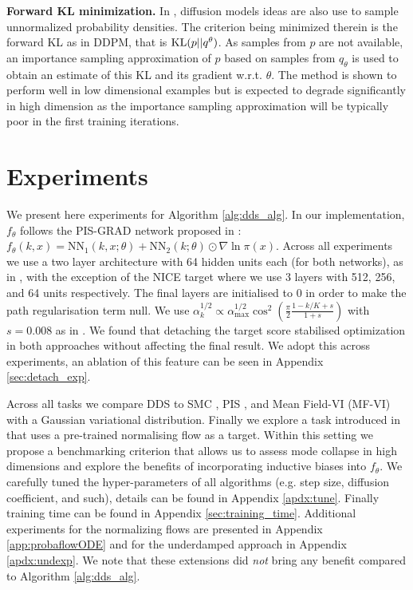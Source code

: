 \documentclass{article} %
\begin{document}
\textbf{Forward KL minimization.}
In \cite{jing2022torsional}, diffusion models ideas are also use to sample unnormalized probability densities. The criterion being minimized therein is the forward KL as in DDPM, that is $\mathrm{KL}(p||q^{\theta})$. As samples from $p$ are not available, an importance sampling approximation of $p$ based on samples from $q_\theta$ is used to obtain an estimate of this KL and its gradient w.r.t. $\theta$. The method is shown to perform well in low dimensional examples but is expected to degrade significantly in high dimension as the importance sampling approximation will be typically poor in the first training iterations.

\section{Experiments}\label{sec:experiments}
We present here experiments for Algorithm \ref{alg:dds_alg}. In our implementation, $f_\theta$ follows the PIS-GRAD network proposed in \citep{zhangyongxinchen2021path}: $ f_\theta(k, x) \!=\! \mathrm{NN}_1(k, x;\theta) + \mathrm{NN}_2(k;\theta) \odot \nabla \ln  \pi(x)$. Across all experiments we use a two layer architecture with 64 hidden units each (for both networks), as in \cite{zhangyongxinchen2021path}, with the exception of the NICE \citep{dinh2014nice} target where we use 3 layers with 512, 256, and 64 units respectively. The final layers are initialised to $0$ in order to make the path regularisation term null. We use $\alpha_k^{1/2} \!\propto\! \alpha_{\max}^{1/2}\cos^2\left(\frac{\pi}{2}\frac{1- k  /K  + s}{1 +s}\right)$ with $s\!=\!0.008$ as in \citep{nichol2021improved}.
We found that detaching the target score stabilised optimization in both approaches without affecting the final result. We adopt this across experiments, an ablation of this feature can be seen in Appendix \ref{sec:detach_exp}. 

Across all tasks we compare DDS to SMC \citep{del2006sequential,zhou2016toward}, PIS \citep{barrlamacraft2020quantum,vargas2021bayesian,zhangyongxinchen2021path}, and Mean Field-VI (MF-VI) with a Gaussian variational distribution.  Finally we explore a task introduced in \citep{doucet2022annealed} that uses a pre-trained normalising flow as a target. Within this setting we propose a benchmarking criterion that allows us to assess mode collapse in high dimensions and explore the benefits of incorporating inductive biases into $f_\theta$. We carefully tuned the hyper-parameters of all algorithms (e.g. step size, diffusion coefficient, and such), details can be found in Appendix \ref{apdx:tune}. Finally training time can be found in Appendix \ref{sec:training_time}.
Additional experiments for the normalizing flows are presented in Appendix \ref{app:probaflowODE} and for the underdamped approach in Appendix \ref{apdx:undexp}. We note that these extensions did \emph{not} bring any benefit compared to Algorithm \ref{alg:dds_alg}.
\end{document}
